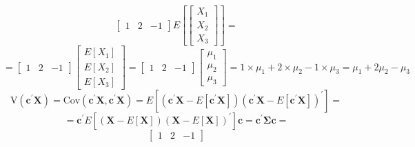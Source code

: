 \begin{enumerate}[font=\bfseries]
\begin{enumerate}
\[\begin{bmatrix}
                    1 & 2 & -1
                \end{bmatrix}                
                E\left[
                \begin{bmatrix}
                    X_1 \\
                    X_2 \\
                    X_3
                \end{bmatrix}
                \right]
                =
            \]
            \[
                =
                \begin{bmatrix}
                    1 & 2 & -1
                \end{bmatrix}                
                \begin{bmatrix}
                    E\left[X_1\right] \\
                    E\left[X_2\right] \\
                    E\left[X_3\right]
                \end{bmatrix}
                =
                \begin{bmatrix}
                    1 & 2 & -1
                \end{bmatrix}                
                \begin{bmatrix}
                    \mu_1 \\
                    \mu_2 \\
                    \mu_3
                \end{bmatrix}
                =
                1 \times \mu_1 + 2 \times \mu_2 - 1 \times \mu_3
                =
                \mu_1 + 2 \mu_2  - \mu_3
            \]
            \[
                \text{V}\left(\textbf{c}^\prime\textbf{X}\right)
                =
                \text{Cov}\left(\textbf{c}^\prime\textbf{X},\textbf{c}^\prime\textbf{X}\right)
                =
                E\left[\left(\textbf{c}^\prime\textbf{X} - E\left[\textbf{c}^\prime\textbf{X}\right]\right)\left(\textbf{c}^\prime\textbf{X} - E\left[\textbf{c}^\prime\textbf{X}\right]\right)^\prime\right]
                =
            \]
            \[
                =
                \textbf{c}^\prime E\left[\left(\textbf{X} - E\left[\textbf{X}\right]\right){\left(\textbf{X} - E\left[\textbf{X}\right]\right)}^\prime\right]\textbf{c}
                =
                \textbf{c}^\prime\mathbf{\Sigma}\textbf{c}
                =
            \]
            \[
                \begin{bmatrix}
                    1 & 2 & -1

\end{bmatrix}\]
\end{enumerate}
\end{enumerate}
